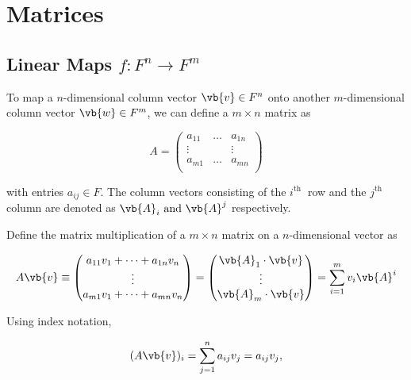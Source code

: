 \documentclass[a4paper,12pt]{report}
\begin{document}
\section{Matrices}

\subsection{Linear Maps \(f: F^{n} \rightarrow F^{m}  \)}
To map a \(n\)-dimensional column vector \(\vb{v} \in F^{n} \) onto another \(m\)-dimensional column vector \(\vb{w} \in F^{m} \), we can define a \(m \times  n\) matrix as 

\begin{equation}
    A = \begin{pmatrix}
        a_{11} & \ldots  & a_{1n}   \\
        \vdots  &  & \vdots  \\
        a_{m1}  & \ldots  & a_{mn}  \\
    \end{pmatrix}
\end{equation}

with entries \(a_{ij} \in F \). The column vectors consisting of the \(i^{\text{th }} \) row and the \(j^{\text{th }} \) column are denoted as \(\vb{A} _{i} \text { and } \vb{A} ^{j} \) respectively. 

Define the matrix multiplication of a \(m \times  n\) matrix on a \(n\)-dimensional vector as   

\begin{equation}\label{matrixmultiplication} 
     A\vb{v} \equiv \begin{pmatrix}
         a_{11}v_{1} + \cdots + a_{1n}v_{n}    \\
        \vdots   \\
        a_{m1}v_{1} + \cdots + a_{mn}v_{n}    \\
    \end{pmatrix} = \begin{pmatrix}
         \vb{A} _{1} \cdot \vb{v}  \\
        \vdots   \\
        \vb{A} _{m} \cdot \vb{v}   \\
    \end{pmatrix} =  \sum_{i=1}^{m} v_{i} \vb{A} ^{i}    
\end{equation}

Using index notation,

\begin{equation}\label{matmul} 
    (A\vb{v} )_{i} =  \sum_{j=1}^{n} a_{ij} v_{j} = a_{ij} v_{j}, 
\end{equation}
\end{document}
